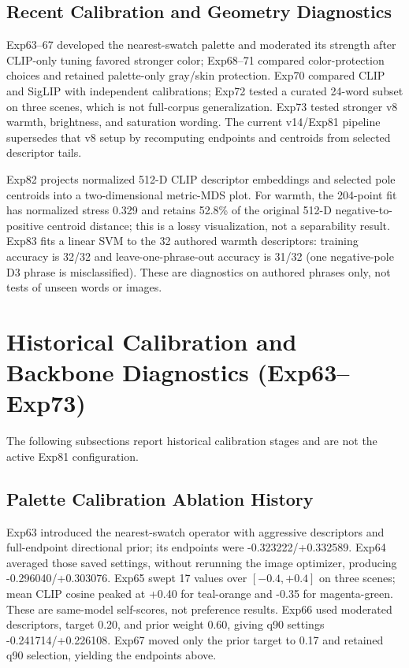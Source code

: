 \documentclass[journal]{IEEEtran}
\begin{document}
\subsection{Recent Calibration and Geometry Diagnostics}
Exp63--67 developed the nearest-swatch palette and moderated its strength after CLIP-only tuning favored stronger color; Exp68--71 compared color-protection choices and retained palette-only gray/skin protection. Exp70 compared CLIP and SigLIP with independent calibrations; Exp72 tested a curated 24-word subset on three scenes, which is not full-corpus generalization. Exp73 tested stronger v8 warmth, brightness, and saturation wording. The current v14/Exp81 pipeline supersedes that v8 setup by recomputing endpoints and centroids from selected descriptor tails.

Exp82 projects normalized 512-D CLIP descriptor embeddings and selected pole centroids into a two-dimensional metric-MDS plot. For warmth, the 204-point fit has normalized stress 0.329 and retains 52.8\% of the original 512-D negative-to-positive centroid distance; this is a lossy visualization, not a separability result. Exp83 fits a linear SVM to the 32 authored warmth descriptors: training accuracy is 32/32 and leave-one-phrase-out accuracy is 31/32 (one negative-pole D3 phrase is misclassified). These are diagnostics on authored phrases only, not tests of unseen words or images.

\section{Historical Calibration and Backbone Diagnostics (Exp63--Exp73)}
The following subsections report historical calibration stages and are not the active Exp81 configuration.
\subsection{Palette Calibration Ablation History}
Exp63 introduced the nearest-swatch operator with aggressive descriptors and full-endpoint directional prior; its endpoints were -0.323222/+0.332589. Exp64 averaged those saved settings, without rerunning the image optimizer, producing -0.296040/+0.303076. Exp65 swept 17 values over $[-0.4,+0.4]$ on three scenes; mean CLIP cosine peaked at +0.40 for teal-orange and -0.35 for magenta-green. These are same-model self-scores, not preference results. Exp66 used moderated descriptors, target 0.20, and prior weight 0.60, giving q90 settings -0.241714/+0.226108. Exp67 moved only the prior target to 0.17 and retained q90 selection, yielding the endpoints above.
\end{document}
